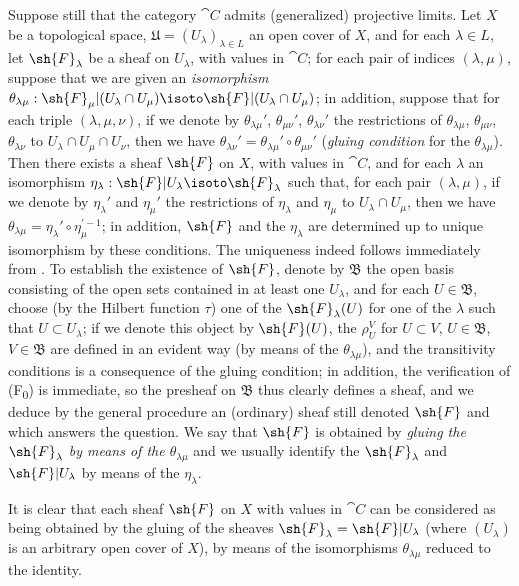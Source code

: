 \begin{env}[3.3.1]
\label{0.3.3.1}
Suppose still that the category $\cat{C}$ admits (generalized) projective limits. Let
$X$ be a topological space, $\mathfrak{U}=(U_\lambda)_{\lambda\in L}$ an open
cover of $X$, and for each $\lambda\in L$, let $\sh{F}_\lambda$ be a sheaf on
$U_\lambda$, with values in $\cat{C}$; for each pair of indices $(\lambda,\mu)$,
suppose that we are given an \emph{isomorphism}
$\theta_{\lambda\mu}:\sh{F}_\mu|(U_\lambda\cap U_\mu)
  \isoto\sh{F}|(U_\lambda\cap U_\mu)$; in addition, suppose that for each triple
$(\lambda,\mu,\nu)$, if we denote by $\theta_{\lambda\mu}'$, $\theta_{\mu\nu}'$,
$\theta_{\lambda\nu}'$ the restrictions of $\theta_{\lambda\mu}$,
$\theta_{\mu\nu}$, $\theta_{\lambda\nu}$ to $U_\lambda\cap U_\mu\cap U_\nu$,
then we have $\theta_{\lambda\nu}'=\theta_{\lambda\mu}'\circ\theta_{\mu\nu}'$
(\emph{gluing condition} for the $\theta_{\lambda\mu}$). Then there exists a
sheaf $\sh{F}$ on $X$, with values in $\cat{C}$, and for each $\lambda$ an
isomorphism $\eta_\lambda:\sh{F}|U_\lambda\isoto\sh{F}_\lambda$ such that, for
each pair $(\lambda,\mu)$, if we denote by $\eta_\lambda'$ and $\eta_\mu'$ the
restrictions of $\eta_\lambda$ and $\eta_\mu$ to $U_\lambda\cap U_\mu$, then we
have $\theta_{\lambda\mu}=\eta_\lambda'\circ\eta_\mu^{\prime-1}$; in addition,
$\sh{F}$ and the $\eta_\lambda$ are determined up to unique isomorphism by these
conditions. The uniqueness indeed follows immediately from .
To establish the existence of $\sh{F}$, denote by $\mathfrak{B}$ the open basis
consisting of the open sets contained in at least one $U_\lambda$, and for each
$U\in\mathfrak{B}$, choose (by the Hilbert function $\tau$) one of the
$\sh{F}_\lambda(U)$ for one of the $\lambda$ such that $U\subset U_\lambda$; if
we denote this object by $\sh{F}(U)$, the $\rho_U^V$ for $U\subset V$,
$U\in\mathfrak{B}$, $V\in\mathfrak{B}$ are defined in an evident way (by means
of the $\theta_{\lambda\mu}$), and the transitivity conditions is a consequence
of the gluing condition; in addition, the verification of (F\textsubscript{0}) is immediate,
so the presheaf on $\mathfrak{B}$ thus clearly defines a sheaf, and we deduce by
the general procedure  an (ordinary) sheaf still denoted
$\sh{F}$ and which answers the question. We say that $\sh{F}$ is obtained by
\emph{gluing the $\sh{F}_\lambda$ by means of the $\theta_{\lambda\mu}$} and we
usually identify the $\sh{F}_\lambda$ and $\sh{F}|U_\lambda$ by means of the
$\eta_\lambda$.

It is clear that each sheaf $\sh{F}$ on $X$ with values in $\cat{C}$ can be
considered as being obtained by the gluing of the sheaves
$\sh{F}_\lambda=\sh{F}|U_\lambda$ (where $(U_\lambda)$ is an arbitrary open
cover of $X$), by means of the isomorphisms $\theta_{\lambda\mu}$ reduced to the
identity.
\end{env}

